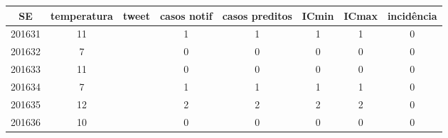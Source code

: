 \begin{tabular}{c|ccccccc}
  \hline
SE & temperatura & tweet & casos notif & casos preditos & ICmin & ICmax & incidência \\ 
  \hline
201631 & 11 &  & 1 & 1 & 1 & 1 & 0 \\ 
  201632 & 7 &  & 0 & 0 & 0 & 0 & 0 \\ 
  201633 & 11 &  & 0 & 0 & 0 & 0 & 0 \\ 
  201634 & 7 &  & 1 & 1 & 1 & 1 & 0 \\ 
  201635 & 12 &  & 2 & 2 & 2 & 2 & 0 \\ 
  201636 & 10 &  & 0 & 0 & 0 & 0 & 0 \\ 
   \hline
\end{tabular}
